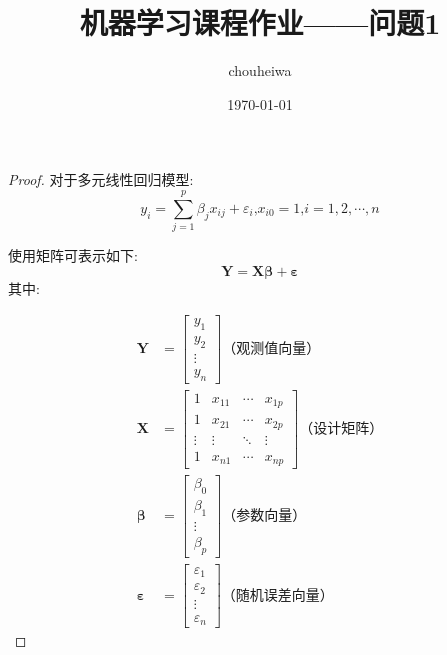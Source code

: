 \documentclass[UTF8]{article} %
\title{机器学习课程作业——问题1}
\author{chouheiwa}
\date{\today}
\newcommand{\BoldEpsilon}{\boldsymbol{\varepsilon}}
\begin{document}
    \maketitle

    \begin{proof}
        对于多元线性回归模型:
        \begin{equation}
            y_i = \sum_{j=1}^p \beta_j x_{ij} + \varepsilon_i \text{,} x_{i0} = 1 \text{,} i = 1,2,\cdots,n \label{eq:eq_y_i}
        \end{equation}

        使用矩阵可表示如下:
        \begin{equation}
            \mathbf{Y} = \mathbf{X} \mathbf{\beta} + \BoldEpsilon \label{eq:eq_y}
        \end{equation}
        其中:

        \begin{align}
            \mathbf{Y} &= \begin{bmatrix}
                              y_1    \\
                              y_2    \\
                              \vdots \\
                              y_n
            \end{bmatrix} \text{（观测值向量）} \\
            \mathbf{X} &= \begin{bmatrix}
                              1      & x_{11} & \cdots & x_{1p} \\
                              1      & x_{21} & \cdots & x_{2p} \\
                              \vdots & \vdots & \ddots & \vdots \\
                              1      & x_{n1} & \cdots & x_{np}
            \end{bmatrix} \text{（设计矩阵）} \\
            \mathbf{\beta} &= \begin{bmatrix}
                                  \beta_0 \\
                                  \beta_1 \\
                                  \vdots  \\
                                  \beta_p
            \end{bmatrix} \text{（参数向量）} \\
            \BoldEpsilon &= \begin{bmatrix}
                                \varepsilon_1 \\
                                \varepsilon_2 \\
                                \vdots        \\
                                \varepsilon_n
            \end{bmatrix} \text{（随机误差向量）}
        \end{align}


\end{proof}
\end{document}
